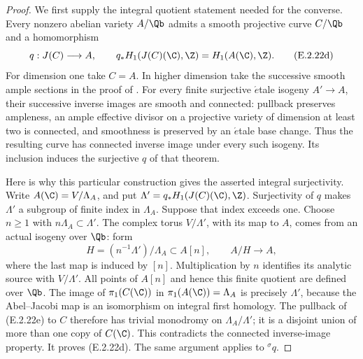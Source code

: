 \begin{proof}
We first supply the integral quotient statement needed for the
converse. Every nonzero abelian variety \(A/\Qb\) admits a
smooth projective curve \(C/\Qb\) and a homomorphism
\[
 q:J(C)\longrightarrow A,\qquad
 q_*H_1(J(C)(\C),\Z)=H_1(A(\C),\Z).
 \tag{E.2.22d}
\]
For dimension one take \(C=A\). In higher dimension take the
successive smooth ample sections in the proof of
\cite[Theorem 10.1, Lemma 10.3, pp.33--35]{GenMilneJVs2021}.
For every finite surjective \(\acute{e}\)tale isogeny
\(A'\to A\), their successive inverse images are smooth and
connected: pullback preserves ampleness, an ample effective
divisor on a projective variety of dimension at least two is
connected, and smoothness is preserved by an \(\acute{e}\)tale
base change. Thus the resulting curve has connected inverse
image under every such isogeny. Its inclusion induces the
surjective \(q\) of that theorem.

Here is why this particular construction gives the asserted
integral surjectivity. Write
\(A(\C)=V/\Lambda_A\), and put
\(\Lambda'=q_*H_1(J(C)(\C),\Z)\).
Surjectivity of \(q\) makes \(\Lambda'\) a subgroup of finite
index in \(\Lambda_A\). Suppose that index exceeds one.
Choose \(n\geq1\) with \(n\Lambda_A\subset\Lambda'\).
The complex torus \(V/\Lambda'\), with its map to \(A\),
comes from an actual isogeny over \(\Qb\): form
\[
 H=(n^{-1}\Lambda')/\Lambda_A\subset A[n],
 \qquad A/H\longrightarrow A,
 \tag{E.2.22e}
\]
where the last map is induced by \([n]\).
Multiplication by \(n\) identifies its analytic source with
\(V/\Lambda'\). All points of \(A[n]\) and hence this finite
quotient are defined over \(\Qb\).
The image of \(\pi_1(C(\C))\) in
\(\pi_1(A(\C))=\Lambda_A\) is precisely \(\Lambda'\),
because the Abel--Jacobi map is an isomorphism on integral
first homology. The pullback of (E.2.22e) to \(C\) therefore
has trivial monodromy on \(\Lambda_A/\Lambda'\); it is a
disjoint union of more than one copy of \(C(\C)\).
This contradicts the connected inverse-image property.
It proves (E.2.22d). The same argument applies to
\({}^{\sigma}q\).


\end{proof}
